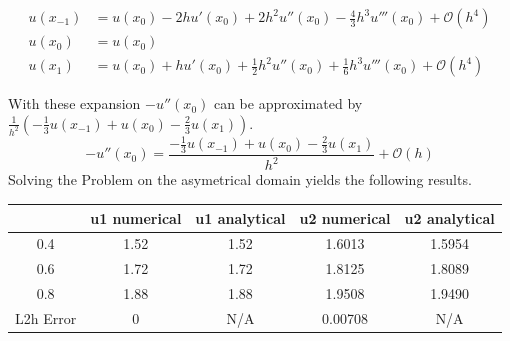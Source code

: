 \documentclass{article}
\begin{document}
\begin{align}
	u(x_{-1}) &= u(x_0) - 2h u'(x_0) + 2h^2u''(x_0)-\frac{4}{3}h^3u'''(x_0) +\mathcal{O}(h^4)\\
	u(x_{0}) &= u(x_0)\\
	u(x_{1}) &= u(x_0) +h u'(x_0) + \frac{1}{2}h^2u''(x_0)+\frac{1}{6}h^3u'''(x_0)+\mathcal{O}(h^4)
\end{align}

With these expansion $-u''(x_{0})$ can be approximated by $\frac{1}{h^2}(-\frac{1}{3}u(x_{-1})+u(x_{0})-\frac{2}{3}u(x_{1}))$. 
\begin{equation}
-u''(x_{0})=\frac{-\frac{1}{3} u(x_{-1}) + u(x_{0}) - \frac{2}{3} u(x_{1})}{h^2}+\mathcal{O}(h)
\end{equation}
Solving the Problem on the asymetrical domain yields the following results.
\begin{table}[H]
    \centering
    \begin{tabular}{c|c|c|c|c}
        & u1 numerical & u1 analytical & u2 numerical & u2 analytical \\ \hline
        0.4 & 1.52 & 1.52 & 1.6013 & 1.5954 \\ \hline
        0.6 & 1.72 & 1.72 & 1.8125 & 1.8089 \\ \hline
        0.8 & 1.88 & 1.88 & 1.9508 & 1.9490 \\ \hline
        L2h Error& $0$ & N/A &0.00708 & N/A
    \end{tabular}
\end{table}
\end{document}
